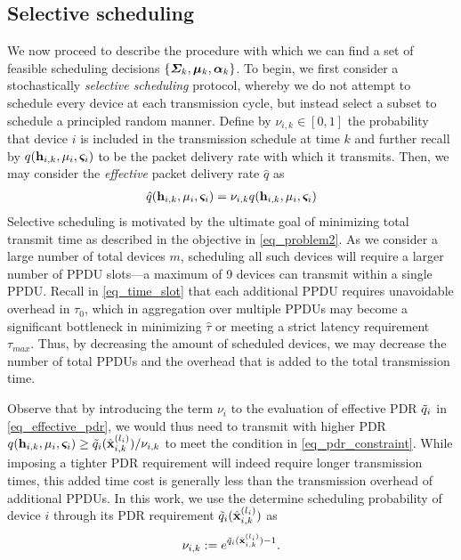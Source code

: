 \subsection{Selective scheduling}\label{sec_rss}
We now proceed to describe the procedure with which we can find a set of feasible scheduling decisions $\{\boldsymbol{\Sigma}_k, \boldsymbol{\mu}_k, \boldsymbol{\alpha}_k\}$. To begin, we first consider a stochastically \emph{selective scheduling} protocol, whereby we do not attempt to schedule every device at each transmission cycle, but instead select a subset to schedule a principled random manner. Define by $\nu_{i,k} \in [0,1]$ the probability that device $i$ is included in the transmission schedule at time $k$ and further recall by $q({\mathbf h}_{i,k},\mu_i,\boldsymbol{\varsigma}_i)$ to be the packet delivery rate with which it transmits. Then, we may consider the \emph{effective} packet delivery rate $\hat{q}$ as 
%
\begin{align}\label{eq_effective_pdr}
\hat{q}(\bbh_{i,k},\mu_i,\bbsigma_i) = \nu_{i,k} q(\bbh_{i,k},\mu_i,\bbsigma_i)
\end{align}
%
Selective scheduling is motivated by the ultimate goal of minimizing total transmit time as described in the objective in \eqref{eq_problem2}. As we consider a large number of total devices $m$, scheduling all such devices will require a larger number of PPDU slots---a maximum of 9 devices can transmit within a single PPDU. Recall in \eqref{eq_time_slot} that each additional PPDU requires unavoidable overhead in $\tau_0$, which in aggregation over multiple PPDUs may become a significant bottleneck in minimizing $\hat{\tau}$ or meeting a strict latency requirement $\tau_{max}$. Thus, by decreasing the amount of scheduled devices, we may decrease the number of total PPDUs and the overhead that is added to the total transmission time. 

Observe that by introducing the term $\nu_i$ to the evaluation of effective PDR ${\tilde q}_i$ in \eqref{eq_effective_pdr}, we would thus need to transmit with higher PDR $q({\mathbf h}_{i,k},\mu_i,\boldsymbol{\varsigma}_i) \geq {\ensuremath{\tilde q}}_i({\hat{\mathbf x} }^{(l_i)}_{i,k})/\nu_{i,k}$ to meet the condition in \eqref{eq_pdr_constraint}. While imposing a tighter PDR requirement will indeed require longer transmission times, this added time cost is generally less than the transmission overhead of additional PPDUs. In this work, we use the determine scheduling probability of device $i$ through its PDR requirement ${\tilde q}_i({\hat{\mathbf x} }^{(l_i)}_{i,k})$ as 
%
\begin{align}\label{eq_prob_c}
\nu_{i,k} := e^{\tdq_i(\hbx^{(l_i)}_{i,k})-1} .
\end{align}
%

